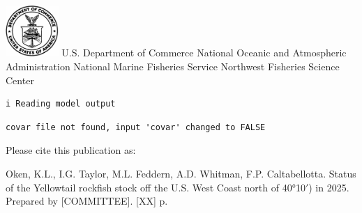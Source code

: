 \documentclass[
]{scrartcl}
\renewcommand*\contentsname{Table of contents}
\newcommand\contentsname{Table of contents}
\begin{document}
\begin{titlepage}
\begin{minipage}[b][\textheight][s]{\textwidth}
  \vspace{1\baselineskip}



  \vfill


  \vspace{1\baselineskip}

  \includegraphics[alt={},width=2cm]{support_files/us_doc_logo.png}\newline %
  U.S. Department of Commerce\newline
  National Oceanic and Atmospheric Administration\newline
  National Marine Fisheries Service\newline
  Northwest Fisheries Science Center\newline

  \end{minipage}
  \restoregeometry
  \end{titlepage}

\renewcommand*\contentsname{Table of contents}
{
\hypersetup{linkcolor=}
\setcounter{tocdepth}{3}
\tableofcontents
}
\listoffigures
\listoftables
\begin{verbatim}
i Reading model output
\end{verbatim}

\begin{verbatim}
covar file not found, input 'covar' changed to FALSE
\end{verbatim}

\newpage{}

Please cite this publication as:

Oken, K.L., I.G. Taylor, M.L. Feddern, A.D. Whitman, F.P. Caltabellotta.
Status of the Yellowtail rockfish stock off the U.S. West Coast north of
40°10\(\prime\)) in 2025. Prepared by {[}COMMITTEE{]}. {[}XX{]} p.

\newpage{}
\end{document}
